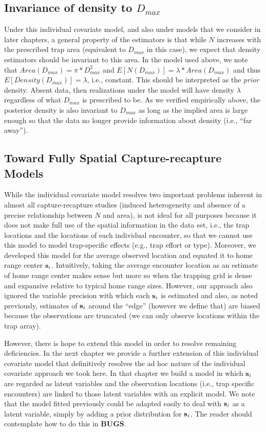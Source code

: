 \subsection{Invariance of density to $D_{max}$}

Under this individual covariate model, and also under models that we
consider in later chapters, a general property of the estimators is
that while $N$ increases with the prescribed trap area (equivalent to
$D_{max}$ in this case), we expect that density estimators should be
invariant to this area. In the model used above, we note that
$Area(D_{max}) = \pi*D_{max}^{2}$ and $E[N(D_{max})] =
\lambda*Area(D_{max})$ and thus $E[Density(D_{max})] = \lambda$, i.e.,
constant. This should be interpreted as the {\it prior}
density. Absent data, then realizations under the model will have
density $\lambda$ regardless of what $D_{max}$ is prescribed to be.
As we verified empirically above, the posterior density is also
invariant to $D_{max}$ as long as the implied area is large enough so
that the data no longer provide information about density (i.e., ``far
away'').

\subsection{Toward Fully Spatial Capture-recapture Models}

While the individual covariate model resolves two important problems
inherent in almost all capture-recapture studies (induced
heterogeneity and absence of a precise relationship between $N$ and
area), is not ideal for all purposes because it does not make full use
of the spatial information in the data set, i.e., the trap locations
and the locations of each individual encounter, so that we cannot use
this model to model trap-specific effects (e.g., trap effort or type).
Moreover, we developed this model for the average observed location
and equated it to home range center ${\bf s}_{i}$. Intuitively, taking
the average encounter location as an estimate of home range center
makes sense but more so when the trapping grid is dense and expansive
relative to typical home range sizes.  However, our approach also
ignored the variable precision with which each ${\bf s}_{i}$ is
estimated and also, as noted previously, estimates of ${\bf s}_{i}$
around the ``edge'' (however we define that) are biased because the
observations are truncated (we can only observe locations within the
trap array).

However, there is hope to extend this model in order to resolve
remaining deficiencies.  In the next chapter we provide a further
extension of this individual covariate model that definitively
resolves the ad hoc nature of the individual covariate approach we
took here. In that chapter we build a model in which ${\bf s}_{i}$ are
regarded as latent variables and the observation locations (i.e., trap
specific encounters) are linked to those latent variables with an
explicit model. We note that the model fitted previously could be
adapted easily to deal with ${\bf s}_{i}$ as a latent variable, simply
by adding a prior distribution for ${\bf s}_{i}$. The reader should
contemplate how to do this in {\bf BUGS}.


